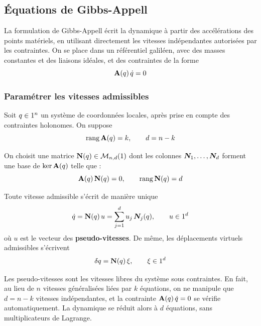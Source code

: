 \subsection{Équations de Gibbs-Appell}

La formulation de Gibbs-Appell écrit la dynamique à partir des
accélérations des points matériels, en utilisant directement les
vitesses indépendantes autorisées par les contraintes. On se place
dans un référentiel galiléen, avec des masses constantes et des
liaisons idéales, et des contraintes de la forme
\[
    \mathbf{A}(q)\,\dot q = 0
\]

\subsubsection{Paramétrer les vitesses admissibles}

Soit $q\in1^n$ un système de coordonnées locales, après prise en
compte des contraintes holonomes. On suppose
\[
    \operatorname{rang}\mathbf{A}(q) = k, \qquad d = n - k
\]

\begin{definition}
    On choisit une matrice $\mathbf{N}(q)\in\mathcal{M}_{n,d}(1)$ dont
    les colonnes $\bm{N}_1,\dots,\bm{N}_d$ forment une base de
    $\ker\mathbf{A}(q)$ telle que : 
    \[
        \mathbf{A}(q)\,\mathbf{N}(q) = 0, \qquad
        \operatorname{rang}\mathbf{N}(q) = d
    \]
\end{definition}

\begin{proposition}
    Toute vitesse admissible s'écrit de manière unique
    \[
        \dot q = \mathbf{N}(q)\,u = \sum_{j=1}^{d} u_j\,\bm{N}_j(q),
        \qquad u\in1^d
    \]
    où $u$ est le vecteur des \textbf{pseudo-vitesses}. De même, les
    déplacements virtuels admissibles s'écrivent
    \[
        \delta q = \mathbf{N}(q)\,\xi, \qquad \xi\in1^d
    \]
\end{proposition}
Les pseudo-vitesses sont les vitesses libres du système sous
contraintes. En fait, au lieu de $n$ vitesses généralisées liées par $k$
équations, on ne manipule que $d = n - k$ vitesses indépendantes, et
la contrainte $\mathbf{A}(q)\,\dot q = 0$ se vérifie automatiquement.
La dynamique se réduit alors à $d$ équations, sans multiplicateurs de
Lagrange.

